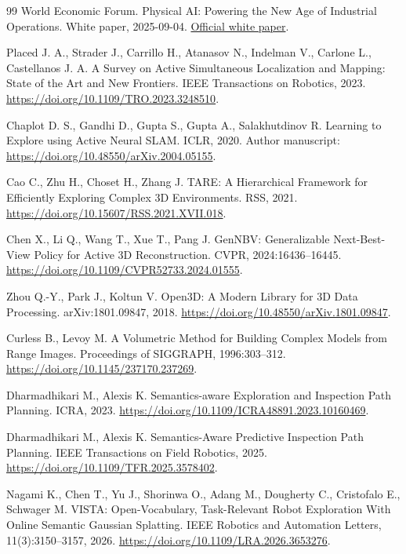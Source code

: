 \begin{thebibliography}{99}
 World Economic Forum. Physical AI: Powering the New Age of Industrial Operations. White paper, 2025-09-04. \href{https://www.weforum.org/publications/physical-ai-powering-the-new-age-of-industrial-operations/}{Official white paper}.

 Placed J. A., Strader J., Carrillo H., Atanasov N., Indelman V., Carlone L., Castellanos J. A. A Survey on Active Simultaneous Localization and Mapping: State of the Art and New Frontiers. IEEE Transactions on Robotics, 2023. \url{https://doi.org/10.1109/TRO.2023.3248510}.

 Chaplot D. S., Gandhi D., Gupta S., Gupta A., Salakhutdinov R. Learning to Explore using Active Neural SLAM. ICLR, 2020. Author manuscript: \url{https://doi.org/10.48550/arXiv.2004.05155}.

 Cao C., Zhu H., Choset H., Zhang J. TARE: A Hierarchical Framework for Efficiently Exploring Complex 3D Environments. RSS, 2021. \url{https://doi.org/10.15607/RSS.2021.XVII.018}.

 Chen X., Li Q., Wang T., Xue T., Pang J. GenNBV: Generalizable Next-Best-View Policy for Active 3D Reconstruction. CVPR, 2024:16436--16445. \url{https://doi.org/10.1109/CVPR52733.2024.01555}.

 Zhou Q.-Y., Park J., Koltun V. Open3D: A Modern Library for 3D Data Processing. arXiv:1801.09847, 2018. \url{https://doi.org/10.48550/arXiv.1801.09847}.

 Curless B., Levoy M. A Volumetric Method for Building Complex Models from Range Images. Proceedings of SIGGRAPH, 1996:303--312. \url{https://doi.org/10.1145/237170.237269}.

 Dharmadhikari M., Alexis K. Semantics-aware Exploration and Inspection Path Planning. ICRA, 2023. \url{https://doi.org/10.1109/ICRA48891.2023.10160469}.

 Dharmadhikari M., Alexis K. Semantics-Aware Predictive Inspection Path Planning. IEEE Transactions on Field Robotics, 2025. \url{https://doi.org/10.1109/TFR.2025.3578402}.

 Nagami K., Chen T., Yu J., Shorinwa O., Adang M., Dougherty C., Cristofalo E., Schwager M. VISTA: Open-Vocabulary, Task-Relevant Robot Exploration With Online Semantic Gaussian Splatting. IEEE Robotics and Automation Letters, 11(3):3150--3157, 2026. \url{https://doi.org/10.1109/LRA.2026.3653276}.


\end{thebibliography}
